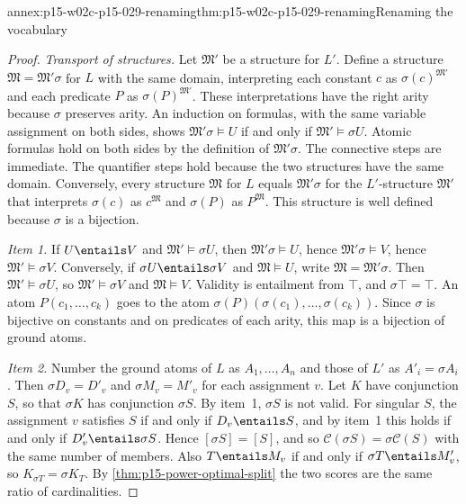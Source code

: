 \begin{annexitem}{annex:p15-w02c-p15-029-renaming}{thm:p15-w02c-p15-029-renaming}{Renaming the vocabulary}
\begin{proof}
\emph{Transport of structures.} Let \(\mathfrak M'\) be a structure for
\(L'\). Define a structure \(\mathfrak M=\mathfrak M'\sigma\) for \(L\)
with the same domain, interpreting each constant \(c\) as
\(\sigma(c)^{\mathfrak M'}\) and each predicate \(P\) as
\(\sigma(P)^{\mathfrak M'}\). These interpretations have the right arity
because \(\sigma\) preserves arity. An induction on formulas, with the
same variable assignment on both sides, shows
\(\mathfrak M'\sigma\models U\) if and only if \(\mathfrak M'\models\sigma U\).
Atomic formulas hold on both sides by the definition of
\(\mathfrak M'\sigma\). The connective steps are immediate. The
quantifier steps hold because the two structures have the same domain.
Conversely, every structure \(\mathfrak M\) for \(L\) equals
\(\mathfrak M'\sigma\) for the \(L'\)-structure \(\mathfrak M'\) that
interprets \(\sigma(c)\) as \(c^{\mathfrak M}\) and \(\sigma(P)\) as
\(P^{\mathfrak M}\). This structure is well defined because \(\sigma\)
is a bijection.

\emph{Item 1.} If \(U\entails V\) and \(\mathfrak M'\models\sigma U\), then
\(\mathfrak M'\sigma\models U\), hence \(\mathfrak M'\sigma\models V\),
hence \(\mathfrak M'\models\sigma V\). Conversely, if
\(\sigma U\entails\sigma V\) and \(\mathfrak M\models U\), write
\(\mathfrak M=\mathfrak M'\sigma\). Then \(\mathfrak M'\models\sigma U\),
so \(\mathfrak M'\models\sigma V\) and \(\mathfrak M\models V\). Validity
is entailment from \(\top\), and \(\sigma\top=\top\). An atom
\(P(c_1,\ldots,c_k)\) goes to the atom
\(\sigma(P)(\sigma(c_1),\ldots,\sigma(c_k))\). Since \(\sigma\) is
bijective on constants and on predicates of each arity, this map is a
bijection of ground atoms.

\emph{Item 2.} Number the ground atoms of \(L\) as \(A_1,\ldots,A_n\)
and those of \(L'\) as \(A'_i=\sigma A_i\). Then \(\sigma D_v=D'_v\) and
\(\sigma M_v=M'_v\) for each assignment \(v\). Let \(K\) have
conjunction \(S\), so that \(\sigma K\) has conjunction \(\sigma S\).
By item~1, \(\sigma S\) is not valid. For singular \(S\), the
assignment \(v\) satisfies \(S\) if and only if \(D_v\entails S\), and by
item~1 this holds if and only if \(D'_v\entails\sigma S\). Hence
\([\sigma S]=[S]\), and so \(\mathcal C(\sigma S)=\sigma\mathcal C(S)\)
with the same number of members. Also \(T\entails M_v\) if and only if
\(\sigma T\entails M'_v\), so \(K_{\sigma T}=\sigma K_T\). By
\cref{thm:p15-power-optimal-split} the two scores are the same ratio of
cardinalities.


\end{proof}
\end{annexitem}
